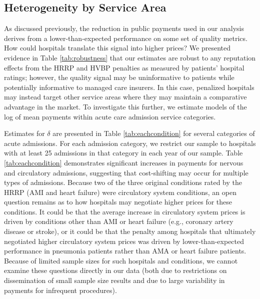 \documentclass[12pt]{article}
\begin{document}
\subsection{Heterogeneity by Service Area}
As discussed previously, the reduction in public payments used in our analysis derives from a lower-than-expected performance on some set of quality metrics. How could hospitals translate this signal into higher prices? We presented evidence in Table \ref{tab:robustness} that our estimates are robust to any reputation effects from the HRRP and HVBP penalties as measured by patients' hospital ratings; however, the quality signal may be uninformative to patients while potentially informative to managed care insurers. In this case, penalized hospitals may instead target other service areas where they may maintain a comparative advantage in the market. To investigate this further, we estimate models of the log of mean payments within acute care admission service categories.

Estimates for $\delta$ are presented in Table \ref{tab:eachcondition} for several categories of acute admissions. For each admission category, we restrict our sample to hospitals with at least 25 admissions in that category in each year of our sample. Table \ref{tab:eachcondition} demonstrates significant increases in payments for nervous and circulatory admissions, suggesting that cost-shifting may occur for multiple types of admissions. Because two of the three original conditions rated by the HRRP (AMI and heart failure) were circulatory system conditions, an open question remains as to how hospitals may negotiate higher prices for these conditions. It could be that the average increase in circulatory system prices is driven by conditions other than AMI or heart failure (e.g., coronary artery disease or stroke), or it could be that the penalty among hospitals that ultimately negotiated higher circulatory system prices was driven by lower-than-expected performance in pneumonia patients rather than AMA or heart failure patients. Because of limited sample sizes for such hospitals and conditions, we cannot examine these questions directly in our data (both due to restrictions on dissemination of small sample size results and due to large variability in payments for infrequent procedures).
\end{document}
